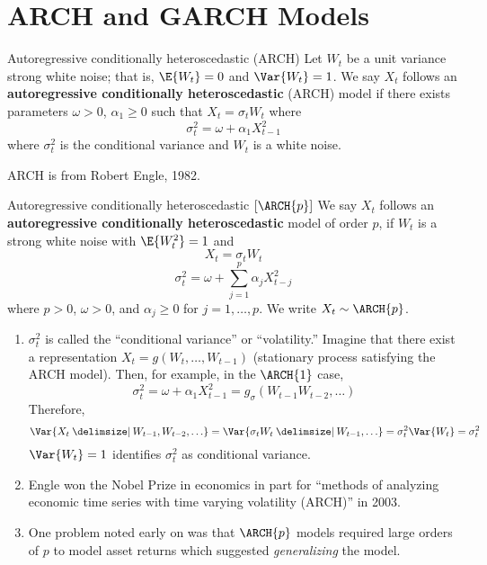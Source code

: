 \section{ARCH and GARCH Models}
\begin{Definition}{Autoregressive conditionally heteroscedastic (ARCH)}{}
    Let $ W_t $ be a unit variance strong white noise; that is,
    $ \E{W_t}=0 $ and $ \Var{W_t}=1 $. We say $ X_t $
    follows an \textbf{autoregressive conditionally heteroscedastic}
    (ARCH) model if there exists parameters $ \omega> 0 $, $ \alpha_1\ge 0 $
    such that $ X_t=\sigma_t W_t $ where
    \[ \sigma_t^2=\omega+\alpha_1 X_{t-1}^2 \]
    where $ \sigma_t^2 $ is the conditional variance and $ W_t $
    is a white noise.
\end{Definition}
\begin{Remark}{}{}
    ARCH is from Robert Engle, 1982.
\end{Remark}
\begin{Definition}{Autoregressive conditionally heteroscedastic $ [\ARCH{p}] $}{}
    We say $ X_t $ follows an \textbf{autoregressive conditionally heteroscedastic} model
    of order $ p $, if $ W_t $ is a strong white noise with $ \E{W_t^2}=1 $
    and
    \[ X_t=\sigma_t W_t \]
    \[ \sigma_t^2=\omega+\sum_{j=1}^{p} \alpha_j X_{t-j}^2 \]
    where $ p>0 $, $ \omega>0$, and $\alpha_j\ge 0$ for $j=1,\ldots,p$.
    We write $ X_t \sim \ARCH{p} $.
\end{Definition}
\begin{Remark}{}{}
    \begin{enumerate}[(1)]
        \item $ \sigma_t^2 $ is called the ``conditional variance'' or ``volatility.''
              Imagine that there exist a representation $ X_t=g(W_t,\ldots,W_{t-1}) $
              (stationary process satisfying the ARCH model). Then, for example, in the
              $ \ARCH{1} $ case,
              \[ \sigma_t^2=\omega+\alpha_1 X_{t-1}^2=g_\sigma(W_{t-1}W_{t-2},\ldots) \]
              Therefore,
              \[ \Var{X_t\given W_{t-1},W_{t-2},\ldots}=\Var{\sigma_t W_t\given W_{t-1},\ldots}=\sigma_t^2\Var{W_t}=\sigma_t^2 \]
              $ \Var{W_t}=1 $ identifies $ \sigma_t^2 $ as conditional variance.
        \item Engle won the Nobel Prize in economics in part for ``methods of analyzing economic
              time series with time varying volatility (ARCH)'' in 2003.
        \item One problem noted early on was that $ \ARCH{p} $
              models required large orders of $ p $ to model asset returns
              which suggested \emph{generalizing} the model.
    \end{enumerate}
\end{Remark}
